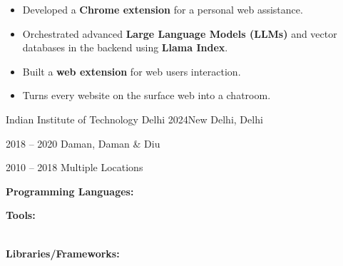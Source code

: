 \documentclass[10pt,a4paper,ragged2e,withhyper]{altacv}
\begin{document}
\begin{paracol}{2}
\divider\smallskip

\begin{itemize}
    \item Developed a \textbf{Chrome extension} for a personal web assistance.
    \item Orchestrated advanced \textbf{Large Language Models (LLMs)} and vector databases in the backend using \textbf{Llama Index}.
\end{itemize}

\divider\smallskip

\begin{itemize}
    \item Built a \textbf{web extension} for web users interaction.
    \item Turns every website on the surface web into a chatroom. 
\end{itemize}

\medskip

\switchcolumn


{Indian Institute of Technology Delhi}
{2024}{New Delhi, Delhi}

\divider
{}
{2018 -- 2020}
{Daman, Daman \& Diu}

\divider
{}
{2010 -- 2018}
{Multiple Locations}

\medskip


\textbf{Programming Languages:}\\
\medskip
{}   

\bigskip
\divider
\smallskip

\textbf{Tools:}\\
\medskip
{}     \\
   

\divider

\textbf{Libraries/Frameworks:}\\
\medskip
{}    \\
  
   \\


\end{paracol}
\end{document}

